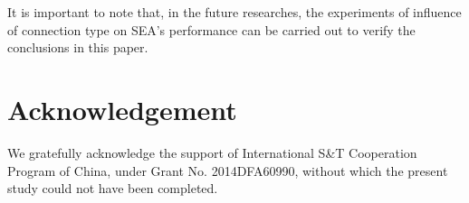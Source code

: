 \documentclass[review,3p,10t]{elsarticle}
\begin{document}
It is important to note that, in the future researches, the experiments of influence of connection type on SEA's performance can be carried out to verify the conclusions in this paper.

\section*{Acknowledgement}
We gratefully acknowledge the support of International S\&T Cooperation Program of China, under Grant No. 2014DFA60990, without which the present study could not have been completed.

\clearpage
\printnomenclature[1cm]{}
\clearpage


\end{document}
